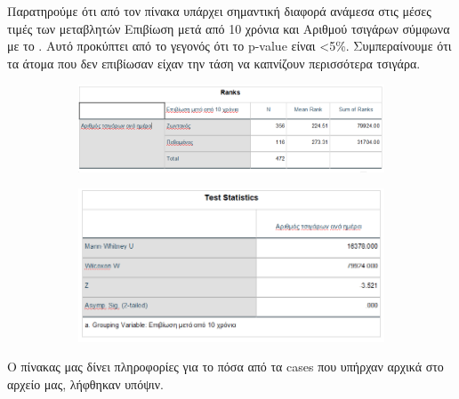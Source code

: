 Παρατηρούμε ότι από τον πίνακα \textbf{} υπάρχει σημαντική διαφορά ανάμεσα στις μέσες τιμές των μεταβλητών Επιβίωση μετά από 10 χρόνια και Αριθμού τσιγάρων σύμφωνα με το . Αυτό προκύπτει από το γεγονός ότι το p-value είναι <5\%. Συμπεραίνουμε  ότι τα άτομα που δεν επιβίωσαν είχαν την τάση να καπνίζουν περισσότερα τσιγάρα.

\vspace{2cm}

 \begin{figure}[h]
     \centering
     \begin{subfigure}{0.8\textwidth}
     \centering
         \includegraphics[width=\textwidth]{images/114.PNG}
              \end{subfigure}
              \end{figure}
     
     \clearpage
     
     \begin{figure}[ht]\ContinuedFloat
     \centering
     \begin{subfigure}{0.8\textwidth}
     \centering
         \includegraphics[width=\textwidth]{images/115.PNG}
             \end{subfigure}
      
\end{figure}

Ο πίνακας \textbf{}  μας δίνει πληροφορίες για το πόσα από τα cases που υπήρχαν αρχικά στο αρχείο μας, λήφθηκαν υπόψιν.

